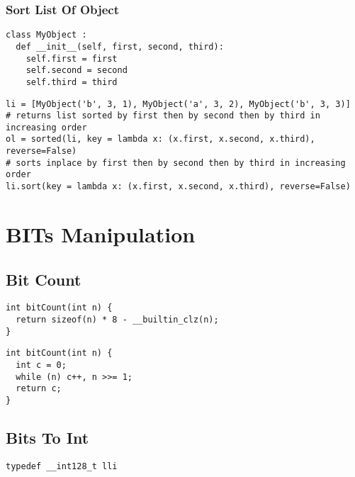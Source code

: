 \documentclass[twoside]{article}
\begin{document}
\begin{multicols*}{2}
\subsubsectionfont{\large\bfseries\sffamily\underline}
\subsubsection*{Sort List Of Object}
\begin{verbatim}
class MyObject :
  def __init__(self, first, second, third):
    self.first = first
    self.second = second
    self.third = third
\end{verbatim}
\vspace{-12pt}
\begin{verbatim}
li = [MyObject('b', 3, 1), MyObject('a', 3, 2), MyObject('b', 3, 3)]
# returns list sorted by first then by second then by third in increasing order
ol = sorted(li, key = lambda x: (x.first, x.second, x.third), reverse=False)
# sorts inplace by first then by second then by third in increasing order
li.sort(key = lambda x: (x.first, x.second, x.third), reverse=False)

\end{verbatim}

\sectionfont{\bfseries\sffamily\centering\Huge}
\vspace{1em}
\section*{BITs Manipulation}
\vspace{3em}
\subsectionfont{\large\bfseries\sffamily\underline}
\subsection*{Bit Count}
\begin{verbatim}
int bitCount(int n) {
  return sizeof(n) * 8 - __builtin_clz(n);
}
\end{verbatim}
\vspace{-12pt}
\begin{verbatim}
int bitCount(int n) {
  int c = 0;
  while (n) c++, n >>= 1;
  return c;
}
\end{verbatim}

\subsectionfont{\large\bfseries\sffamily\underline}
\subsection*{Bits To Int}
\begin{verbatim}
typedef __int128_t lli


\end{verbatim}
\end{multicols*}
\end{document}
